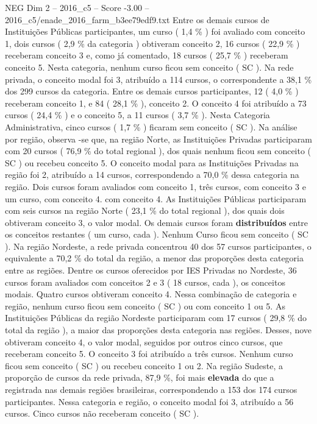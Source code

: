 \begin{textsample}{NEG Dim 2 – 2016\_c5 – Score -3.00 – 2016\_c5/enade\_2016\_farm\_b3ee79edf9.txt}
Entre os demais cursos de Instituições Públicas participantes, um curso ( 1,4 \% ) foi avaliado com conceito 1, dois cursos ( 2,9 \% da categoria ) obtiveram conceito 2, 16 cursos ( 22,9 \% ) receberam conceito 3 e, como já comentado, 18 cursos ( 25,7 \% ) receberam conceito 5.
Nesta categoria, nenhum curso ficou sem conceito ( SC ).
Na rede privada, o conceito modal foi 3, atribuído a 114 cursos, o correspondente a 38,1 \% dos 299 cursos da categoria.
Entre os demais cursos participantes, 12 ( 4,0 \% ) receberam conceito 1, e 84 ( 28,1 \% ), conceito 2.
O conceito 4 foi atribuído a 73 cursos ( 24,4 \% ) e o conceito 5, a 11 cursos ( 3,7 \% ).
Nesta Categoria Administrativa, cinco cursos ( 1,7 \% ) ficaram sem conceito ( SC ).
Na análise por região, observa -se que, na região Norte, as Instituições Privadas participaram com 20 cursos ( 76,9 \% do total regional ), dos quais nenhum ficou sem conceito ( SC ) ou recebeu conceito 5.
O conceito modal para as Instituições Privadas na região foi 2, atribuído a 14 cursos, correspondendo a 70,0 \% dessa categoria na região.
Dois cursos foram avaliados com conceito 1, três cursos, com conceito 3 e um curso, com conceito 4. com conceito 4.
As Instituições Públicas participaram com seis cursos na região Norte ( 23,1 \% do total regional ), dos quais dois obtiveram conceito 3, o valor modal.
Os demais cursos foram \textbf{distribuídos} entre os conceitos restantes ( um curso, cada ).
Nenhum Curso ficou sem conceito ( SC ).
Na região Nordeste, a rede privada concentrou 40 dos 57 cursos participantes, o equivalente a 70,2 \% do total da região, a menor das proporções desta categoria entre as regiões.
Dentre os cursos oferecidos por IES Privadas no Nordeste, 36 cursos foram avaliados com conceitos 2 e 3 ( 18 cursos, cada ), os conceitos modais.
Quatro cursos obtiveram conceito 4.
Nessa combinação de categoria e região, nenhum curso ficou sem conceito ( SC ) ou com conceito 1 ou 5.
As Instituições Públicas da região Nordeste participaram com 17 cursos ( 29,8 \% do total da região ), a maior das proporções desta categoria nas regiões.
Desses, nove obtiveram conceito 4, o valor modal, seguidos por outros cinco cursos, que receberam conceito 5.
O conceito 3 foi atribuído a três cursos.
Nenhum curso ficou sem conceito ( SC ) ou recebeu conceito 1 ou 2.
Na região Sudeste, a proporção de cursos da rede privada, 87,9 \%, foi mais \textbf{elevada} do que a registrada nas demais regiões brasileiras, correspondendo a 153 dos 174 cursos participantes.
Nessa categoria e região, o conceito modal foi 3, atribuído a 56 cursos.
Cinco cursos não receberam conceito ( SC ).

\end{textsample}
